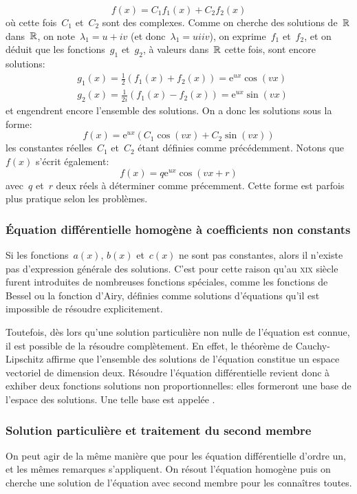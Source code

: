 \begin{enumerate}
\begin{equation}
f(x) = C_1f_1(x) + C_2f_2(x)
\end{equation}
où cette fois~$C_1$ et~$C_2$ sont des complexes. Comme on cherche des solutions de~$\mathbb R$ dans~$\mathbb R$, on note~$\lambda_1 = u + iv$ (et donc~$\lambda_1 = u i iv$), on exprime~$f_1$ et~$f_2$, et on déduit que les fonctions~$g_1$ et~$g_2$, à valeurs dans~$\mathbb R$ cette fois, sont encore solutions:
\begin{align}
&g_1(x) =\frac 12 (f_1(x) + f_2(x) )= \mathrm{e}^{ux}\cos(vx)\\
&g_2(x) = \frac{1}{2i}(f_1(x) - f_2(x)) = \mathrm{e}^{ux}\sin(vx)
\end{align}
et engendrent encore l'ensemble des solutions. On a donc les solutions sous la forme:
\begin{equation}
f(x) = \mathrm{e}^{ux}(C_1\cos(vx) + C_2\sin(vx))
\end{equation}
les constantes réelles~$C_1$ et~$C_2$ étant définies comme précédemment. Notons que~$f(x)$ s'écrit également:
\begin{equation}
f(x) = q \mathrm{e}^{ux}\cos(vx+r)
\end{equation}
avec~$q$ et~$r$ deux réels à déterminer comme précemment. Cette forme est parfois plus pratique selon les problèmes. 
\end{enumerate}
\subsubsection{Équation différentielle homogène à coefficients non constants} Si les fonctions~$a(x)$, $b(x)$ et~$c(x)$ ne sont pas constantes, alors il n'existe pas d'expression générale des solutions. C'est pour cette raison qu'au \textsc{xix} siècle furent introduites de nombreuses fonctions spéciales, comme les fonctions de Bessel ou la fonction d'Airy, définies comme solutions d'équations qu'il est impossible de résoudre explicitement. 

Toutefois, dès lors qu'une solution particulière non nulle de l'équation est connue, il est possible de la résoudre complètement. En effet, le théorème de Cauchy-Lipschitz affirme que l'ensemble des solutions de l'équation constitue un espace vectoriel de dimension deux. Résoudre l'équation différentielle revient donc à exhiber deux fonctions solutions non proportionnelles: elles formeront une base de l'espace des solutions. Une telle base est appelée . 

\subsubsection{Solution particulière et traitement du second membre} On peut agir de la même manière que pour les équation différentielle d'ordre un, et les mêmes remarques s'appliquent. On résout l'équation homogène puis on cherche une solution de l'équation avec second membre pour les connaîtres toutes. 


